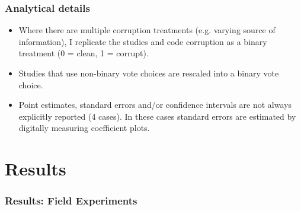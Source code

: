 \documentclass[usenames,dvipsnames]{beamer}
\begin{document}

\begin{frame}
\frametitle{Analytical details}
\begin{itemize}
\item Where there are multiple corruption treatments (e.g. varying source of information), I replicate the studies and code corruption as a binary treatment (0 = clean, 1 = corrupt).
\pause
\item Studies that use non-binary vote choices are rescaled into a binary vote choice.
\pause
\item Point estimates, standard errors and/or confidence intervals are not always explicitly reported (4 cases). In these cases standard errors are estimated by digitally measuring coefficient plots.
\end{itemize}

\end{frame}


\section{Results}

\begin{frame}
\frametitle{Results: Field Experiments}


\end{frame}

\end{document}
